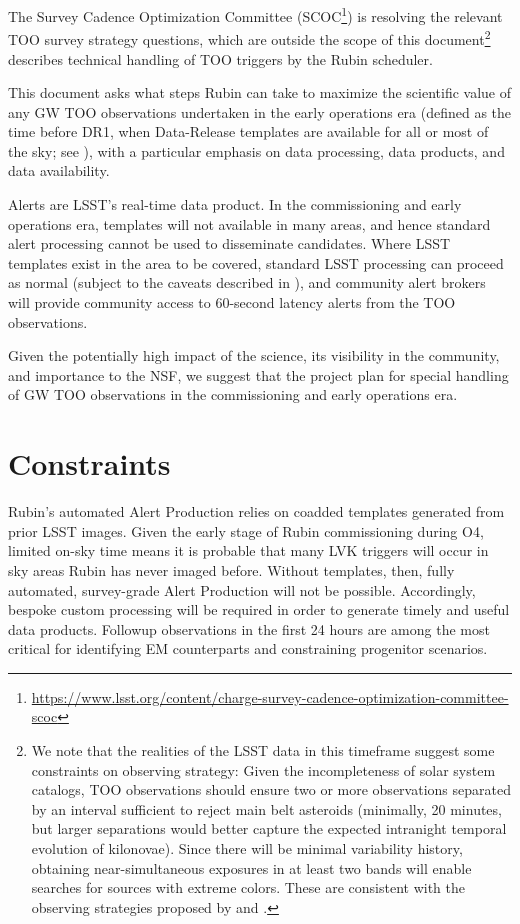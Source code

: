 \documentclass[DM,authoryear,toc]{lsstdoc}
\begin{document}
The Survey Cadence Optimization Committee (SCOC\footnote{\url{https://www.lsst.org/content/charge-survey-cadence-optimization-committee-scoc}}) is resolving the relevant TOO survey strategy questions, which are outside the scope of this document\footnote{We note that the realities of the LSST data in this timeframe suggest some constraints on observing strategy:  
Given the incompleteness of solar system catalogs, TOO observations should ensure two or more observations separated by an interval sufficient to reject main belt asteroids (minimally, 20 minutes, but larger separations would better capture the expected intranight temporal evolution of kilonovae).  
Since there will be minimal variability history, obtaining near-simultaneous exposures in at least two bands will enable searches for sources with extreme colors.  
These are consistent with the observing strategies proposed by \citet{2018arXiv181204051M} and \citet{2022ApJS..260...18A}.} 
 describes technical handling of TOO triggers by the Rubin scheduler.

This document asks what steps Rubin can take to maximize the scientific value of any GW TOO observations undertaken in the early operations era (defined as the time before DR1, when Data-Release templates are available for all or most of the sky; see ), with a particular emphasis on data processing, data products, and data availability.

Alerts are LSST's real-time data product.  
In the commissioning and early operations era, 
templates will not available in many areas, and hence standard alert processing cannot be used to disseminate candidates.
Where LSST templates exist in the area to be covered, standard LSST processing can proceed as normal (subject to the caveats described in ), and community alert brokers will provide community access to 60-second latency alerts from the TOO observations.

Given the potentially high impact of the science, its visibility in the community, and importance to the NSF, we suggest that the project plan for special handling of GW TOO observations in the commissioning and early operations era.  

\section{Constraints} \label{sec:constraints}

Rubin's automated Alert Production relies on coadded templates generated from prior LSST images.  
Given the early stage of Rubin commissioning during O4, limited on-sky time means it is probable that many LVK triggers will occur in sky areas Rubin has never imaged before.
Without templates, then, fully automated, survey-grade Alert Production will not be possible. 
Accordingly, bespoke custom processing will be required in order to generate timely and useful data products.
Followup observations in the first 24 hours are among the most critical for identifying EM counterparts and constraining progenitor scenarios. 
\end{document}
